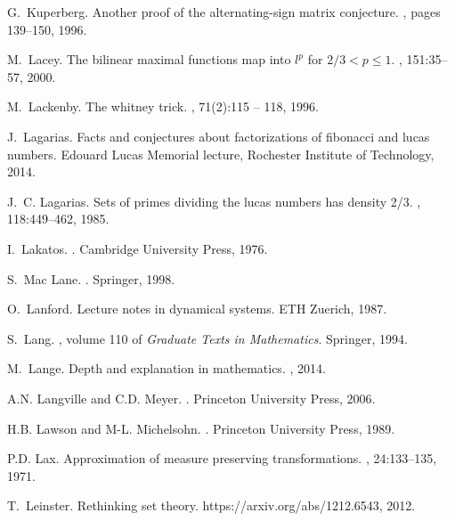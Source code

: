 \documentclass[12pt]{amsart}
\begin{document}
\begin{thebibliography}{100}
G.~Kuperberg.
\newblock Another proof of the alternating-sign matrix conjecture.
, pages 139--150, 1996.

M.~Lacey.
\newblock The bilinear maximal functions map into $l^p$ for $2/3<p \leq 1$.
, 151:35--57, 2000.

M.~Lackenby.
\newblock The whitney trick.
, 71(2):115 -- 118, 1996.

J.~Lagarias.
\newblock Facts and conjectures about factorizations of fibonacci and lucas
  numbers.
\newblock Edouard Lucas Memorial lecture, Rochester Institute of Technology,
  2014.

J.~C. Lagarias.
\newblock Sets of primes dividing the lucas numbers has density 2/3.
, 118:449--462, 1985.

I.~Lakatos.
.
\newblock Cambridge University Press, 1976.

S.~Mac Lane.
.
\newblock Springer, 1998.

O.~Lanford.
\newblock Lecture notes in dynamical systems.
\newblock ETH Zuerich, 1987.

S.~Lang.
, volume 110 of {\em Graduate Texts in
  Mathematics}.
\newblock Springer, 1994.

M.~Lange.
\newblock Depth and explanation in mathematics.
, 2014.

A.N. Langville and C.D. Meyer.
.
\newblock Princeton University Press, 2006.

H.B. Lawson and M-L. Michelsohn.
.
\newblock Princeton University Press, 1989.

P.D. Lax.
\newblock Approximation of measure preserving transformations.
, 24:133--135, 1971.

T.~Leinster.
\newblock Rethinking set theory.
\newblock {\\}https://arxiv.org/abs/1212.6543, 2012.


\end{thebibliography}
\end{document}
